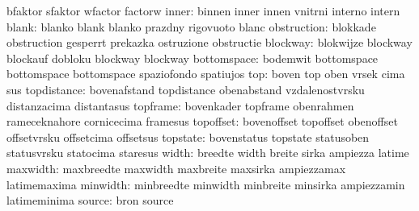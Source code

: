                            bfaktor                   sfaktor
                           wfactor                   factorw %
                    inner: binnen                    inner
                           innen                     vnitrni
                           interno                   intern
                    blank: blanko                    blank
                           blanko                    prazdny
                           rigovuoto                 blanc
              obstruction: blokkade                  obstruction
                           gesperrt                  prekazka
                           ostruzione                obstructie
                 blockway: blokwijze                 blockway
                           blockauf                  dobloku
                           blockway                  blockway %
              bottomspace: bodemwit                  bottomspace
                           bottomspace               bottomspace
                           spaziofondo               spatiujos
                      top: boven                     top
                           oben                      vrsek
                           cima                      sus
              topdistance: bovenafstand              topdistance
                           obenabstand               vzdalenostvrsku
                           distanzacima              distantasus
                 topframe: bovenkader                topframe
                           obenrahmen                rameceknahore
                           cornicecima               framesus
                topoffset: bovenoffset               topoffset
                           obenoffset                offsetvrsku
                           offsetcima                offsetsus
                 topstate: bovenstatus               topstate
                           statusoben                statusvrsku
                           statocima                 staresus
                    width: breedte                   width
                           breite                    sirka
                           ampiezza                  latime
                 maxwidth: maxbreedte                maxwidth
                           maxbreite                 maxsirka
                           ampiezzamax               latimemaxima
                 minwidth: minbreedte                minwidth
                           minbreite                 minsirka
                           ampiezzamin               latimeminima %
                   source: bron                      source
